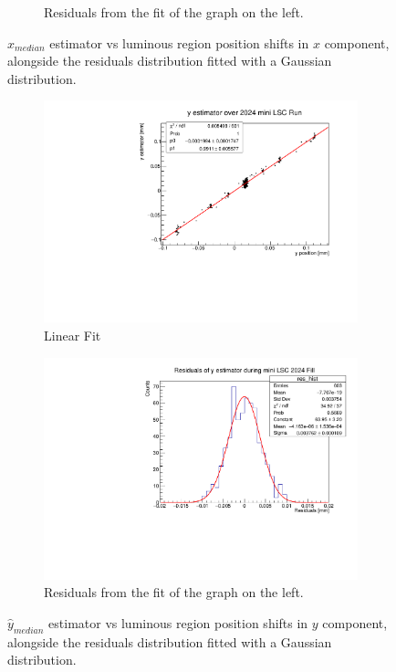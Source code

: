 \begin{figure}
\begin{subfigure}{0.48\textwidth}
    \caption{Residuals from the fit of the graph on the left. }\label{fig:xres_comparison}
    \end{subfigure}
    \caption{$\hat{x}_{median}$ estimator vs luminous region position shifts in $x$ component, alongside the residuals distribution fitted with a Gaussian distribution.}
    \label{fig:x_comaprison}
\end{figure}



\begin{figure}
    \centering
    \begin{subfigure}{0.48\textwidth}
    \includegraphics[width=\linewidth]{figures/y_comparison_side.pdf}
    \caption{Linear Fit}\label{fig:yfit_comparison}
    \end{subfigure}
    \begin{subfigure}{0.48\textwidth}
    \includegraphics[width=\linewidth]{figures/y_comparison_res_side.pdf}
    \caption{Residuals from the fit of the graph on the left. }\label{fig:yres_comparison}
    \end{subfigure}
    \caption{$\hat{y}_{median}$ estimator vs luminous region position shifts in $y$ component, alongside the residuals distribution fitted with a Gaussian distribution.}
    \label{fig:y_comparison}
\end{figure}

